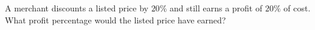 A merchant discounts a listed price by $20\%$ and still earns a profit of $20\%$ of cost. What profit percentage would the listed price have earned?
